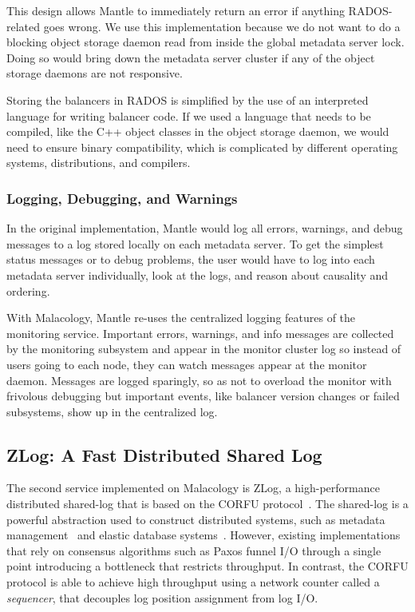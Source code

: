 This design allows Mantle to immediately return an error if anything
RADOS-related goes wrong.  We use this implementation because we do not want to
do a blocking object storage daemon read from inside the global metadata server
lock. Doing so would bring down the metadata server cluster if any of the
object storage daemons are not responsive.

Storing the balancers in RADOS is simplified by the use of an interpreted
language for writing balancer code. If we used a language that needs to be
compiled, like the C++ object classes in the object storage daemon, we would
need to ensure binary compatibility, which is complicated by different
operating systems, distributions, and compilers.

\subsubsection{Logging, Debugging, and Warnings}

In the original implementation, Mantle would log all errors, warnings, and
debug messages to a log stored locally on each metadata server. To get the
simplest status messages or to debug problems, the user would have to log into
each metadata server individually, look at the logs, and reason about causality
and ordering.

With Malacology, Mantle re-uses the centralized logging features of the
monitoring service. Important errors, warnings, and info messages are collected
by the monitoring subsystem and appear in the monitor cluster log so instead of
users going to each node, they can watch messages appear at the monitor daemon.
Messages are logged sparingly, so as not to overload the monitor with frivolous
debugging but important events, like balancer version changes or failed
subsystems, show up in the centralized log.

\subsection{ZLog: A Fast Distributed Shared Log}
\label{sec:zlog}

The second service implemented on Malacology is ZLog, a high-performance
distributed shared-log that is based on the CORFU
protocol~\cite{balakrishnan_corfu_2012}. The shared-log is a powerful
abstraction used to construct distributed systems, such as metadata
management~\cite{balakrishnan:sosp13} and elastic database
systems~\cite{bernstein:cidr11,bernstein:vldb11,bernstein:sigmod15}.  However,
existing implementations that rely on consensus algorithms such as Paxos funnel
I/O through a single point introducing a bottleneck that restricts throughput.
In contrast, the CORFU protocol is able to achieve high throughput using a
network counter called a \emph{sequencer}, that decouples log position
assignment from log I/O.

